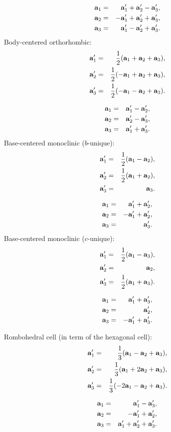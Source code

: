\documentclass[12pt,a4paper,twoside]{report}
\begin{document}
\begin{eqnarray}
{\bf a}_1&=&  {\bf a}_1' + {\bf a}_2' - {\bf a}_3', \\
{\bf a}_2&=& -{\bf a}_1' + {\bf a}_2' + {\bf a}_3', \\
{\bf a}_3&=&  {\bf a}_1' - {\bf a}_2' + {\bf a}_3'.
\end{eqnarray}
Body-centered orthorhombic:
\begin{eqnarray}
{\bf a}_1'&=&{1\over 2} ({\bf a}_1 + {\bf a}_2 + {\bf a}_3), \\
{\bf a}_2'&=&{1\over 2} (-{\bf a}_1 + {\bf a}_2 + {\bf a}_3), \\
{\bf a}_3'&=&{1\over 2} (-{\bf a}_1 - {\bf a}_2 + {\bf a}_3). 
\end{eqnarray}

\begin{eqnarray}
{\bf a}_1&=&  {\bf a}_1' - {\bf a}_2', \\
{\bf a}_2&=&  {\bf a}_2' - {\bf a}_3', \\
{\bf a}_3&=& {\bf a}_1' + {\bf a}_3'.
\end{eqnarray}
Base-centered monoclinic ($b$-unique):
\begin{eqnarray}
{\bf a}_1'&=&{1\over 2} ({\bf a}_1 - {\bf a}_2), \\
{\bf a}_2'&=&{1\over 2} ({\bf a}_1 + {\bf a}_2), \\
{\bf a}_3'&=&{\bf a}_3. 
\end{eqnarray}

\begin{eqnarray}
{\bf a}_1&=&  {\bf a}_1' + {\bf a}_2', \\
{\bf a}_2&=& -{\bf a}_1' + {\bf a}_2', \\
{\bf a}_3&=& {\bf a}_3'.
\end{eqnarray}
Base-centered monoclinic ($c$-unique):
\begin{eqnarray}
{\bf a}_1'&=&{1\over 2} ({\bf a}_1 - {\bf a}_3), \\
{\bf a}_2'&=&{\bf a}_2, \\
{\bf a}_3'&=&{1\over 2} ({\bf a}_1 + {\bf a}_3). 
\end{eqnarray}

\begin{eqnarray}
{\bf a}_1&=& {\bf a}_1' + {\bf a}_3', \\
{\bf a}_2&=& {\bf a}_2', \\
{\bf a}_3&=& -{\bf a}_1' + {\bf a}_3'.
\end{eqnarray}

Rombohedral cell (in term of the hexagonal cell):
\begin{eqnarray}
{\bf a}_1'&=&{1\over 3} ({\bf a}_1 - {\bf a}_2 + {\bf a}_3), \\
{\bf a}_2'&=&{1\over 3} ({\bf a}_1 + 2 {\bf a}_2 + {\bf a}_3), \\
{\bf a}_3'&=&{1\over 3} (-2 {\bf a}_1 - {\bf a}_2 + {\bf a}_3). 
\end{eqnarray}

\begin{eqnarray}
{\bf a}_1&=& {\bf a}_1' - {\bf a}_3', \\
{\bf a}_2&=& - {\bf a}_1' + {\bf a}_2', \\
{\bf a}_3&=& {\bf a}_1' + {\bf a}_2' + {\bf a}_3'.
\end{eqnarray}
\end{document}
